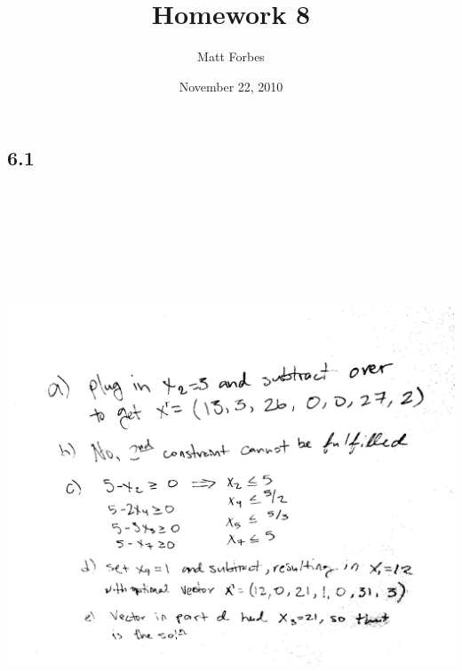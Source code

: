 \documentclass[a4paper,12pt]{article}
\begin{document}
\title{Homework 8}
\author{Matt Forbes}
\date{November 22, 2010}
\maketitle
\begin{center}
\section*{6.1}
\includegraphics[width=7in, height=7in, keepaspectratio=true]{image/sixone.jpg}

\end{center}
\end{document}
